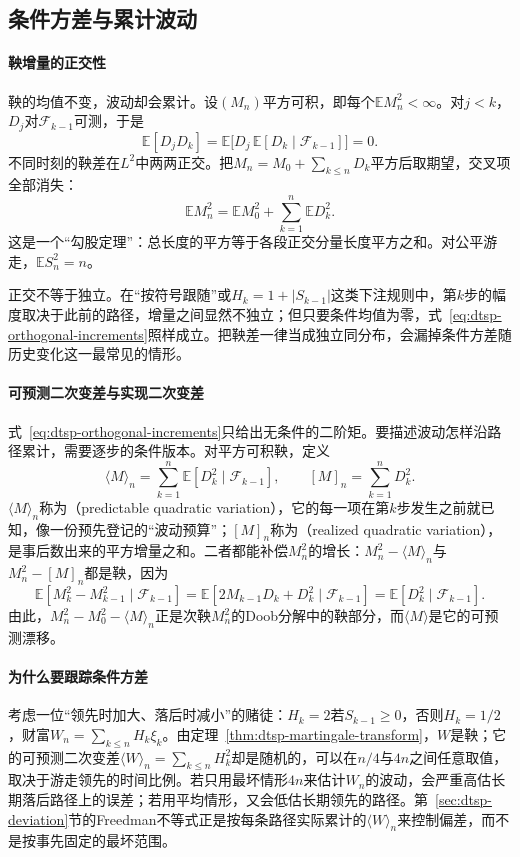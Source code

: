 \subsection{条件方差与累计波动}
\label{sec:dtsp-quadratic-variation}

\paragraph{鞅增量的正交性}
鞅的均值不变，波动却会累计。设$(M_n)$平方可积，即每个$\mathbb EM_n^2<\infty$。对$j<k$，$D_j$对$\mathcal F_{k-1}$可测，于是
\[
  \mathbb E[D_jD_k]=\mathbb E\bigl[D_j\,\mathbb E[D_k\mid\mathcal F_{k-1}]\bigr]=0.
\]
不同时刻的鞅差在$L^2$中两两正交。把$M_n=M_0+\sum_{k\leq n}D_k$平方后取期望，交叉项全部消失：
\begin{equation}
  \mathbb EM_n^2=\mathbb EM_0^2+\sum_{k=1}^n\mathbb ED_k^2.
  \label{eq:dtsp-orthogonal-increments}
\end{equation}
这是一个“勾股定理”：总长度的平方等于各段正交分量长度平方之和。对公平游走，$\mathbb ES_n^2=n$。

正交不等于独立。在“按符号跟随”或$H_k=1+|S_{k-1}|$这类下注规则中，第$k$步的幅度取决于此前的路径，增量之间显然不独立；但只要条件均值为零，式~\eqref{eq:dtsp-orthogonal-increments}照样成立。把鞅差一律当成独立同分布，会漏掉条件方差随历史变化这一最常见的情形。

\paragraph{可预测二次变差与实现二次变差}
式~\eqref{eq:dtsp-orthogonal-increments}只给出无条件的二阶矩。要描述波动怎样沿路径累计，需要逐步的条件版本。对平方可积鞅，定义
\begin{equation}
  \langle M\rangle_n=\sum_{k=1}^n\mathbb E[D_k^2\mid\mathcal F_{k-1}],\qquad
  [M]_n=\sum_{k=1}^nD_k^2.
  \label{eq:dtsp-quadratic-variations}
\end{equation}
$\langle M\rangle_n$称为（predictable quadratic variation），它的每一项在第$k$步发生之前就已知，像一份预先登记的“波动预算”；$[M]_n$称为（realized quadratic variation），是事后数出来的平方增量之和。二者都能补偿$M_n^2$的增长：$M_n^2-\langle M\rangle_n$与$M_n^2-[M]_n$都是鞅，因为
\[
  \mathbb E[M_k^2-M_{k-1}^2\mid\mathcal F_{k-1}]=\mathbb E[2M_{k-1}D_k+D_k^2\mid\mathcal F_{k-1}]=\mathbb E[D_k^2\mid\mathcal F_{k-1}].
\]
由此，$M_n^2-M_0^2-\langle M\rangle_n$正是次鞅$M_n^2$的Doob分解中的鞅部分，而$\langle M\rangle$是它的可预测漂移。

\paragraph{为什么要跟踪条件方差}
考虑一位“领先时加大、落后时减小”的赌徒：$H_k=2$若$S_{k-1}\geq0$，否则$H_k=1/2$，财富$W_n=\sum_{k\leq n}H_k\xi_k$。由定理~\ref{thm:dtsp-martingale-transform}，$W$是鞅；它的可预测二次变差$\langle W\rangle_n=\sum_{k\leq n}H_k^2$却是随机的，可以在$n/4$与$4n$之间任意取值，取决于游走领先的时间比例。若只用最坏情形$4n$来估计$W_n$的波动，会严重高估长期落后路径上的误差；若用平均情形，又会低估长期领先的路径。第~\ref{sec:dtsp-deviation}节的Freedman不等式正是按每条路径实际累计的$\langle W\rangle_n$来控制偏差，而不是按事先固定的最坏范围。
